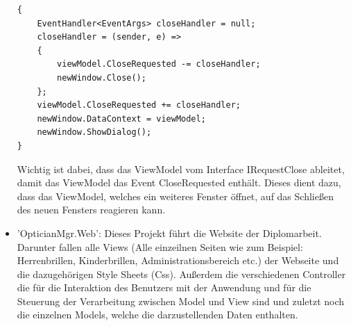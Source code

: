 \begin{itemize}
\begin{lstlisting}
{
	EventHandler<EventArgs> closeHandler = null;
	closeHandler = (sender, e) =>
	{
		viewModel.CloseRequested -= closeHandler;
		newWindow.Close();
	};
	viewModel.CloseRequested += closeHandler;
	newWindow.DataContext = viewModel;
	newWindow.ShowDialog();
}
\end{lstlisting}
Wichtig ist dabei, dass das ViewModel vom Interface IRequestClose ableitet, damit das ViewModel das Event CloseRequested enthält. Dieses dient dazu, dass das ViewModel, welches ein weiteres Fenster öffnet, auf das Schließen des neuen Fensters reagieren kann. 
\item 'OpticianMgr.Web': Dieses Projekt führt die Website der Diplomarbeit. Darunter fallen alle Views (Alle einzeilnen Seiten wie zum Beispiel: Herrenbrillen, Kinderbrillen, Administrationsbereich etc.) der Webseite und die dazugehörigen Style Sheets (Css).
Außerdem die verschiedenen Controller die für die Interaktion des Benutzers mit der Anwendung und für die Steuerung der Verarbeitung zwischen Model und View sind und zuletzt noch die einzelnen Models, welche die darzustellenden Daten enthalten.

\end{itemize} 